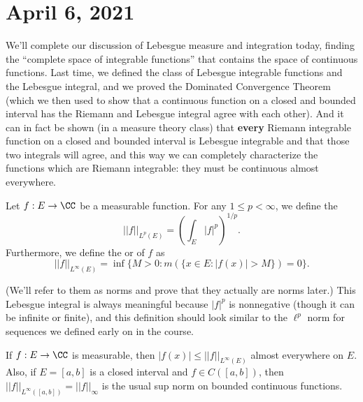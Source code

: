 
\pagebreak\section*{April 6, 2021}

We'll complete our discussion of Lebesgue measure and integration today, finding the ``complete space of integrable functions'' that contains the space of continuous functions. Last time, we defined the class of Lebesgue integrable functions and the Lebesgue integral, and we proved the Dominated Convergence Theorem (which we then used to show that a continuous function on a closed and bounded interval has the Riemann and Lebesgue integral agree with each other). And it can in fact be shown (in a measure theory class) that \textbf{every} Riemann integrable function on a closed and bounded interval is Lebesgue integrable and that those two integrals will agree, and this way we can completely characterize the functions which are Riemann integrable: they must be continuous almost everywhere. 

\begin{definition}
Let $f: E \to \CC$ be a measurable function. For any $1 \le p < \infty$, we define the 
\[
    ||f||_{L^p(E)} = \left(\int_E |f|^p\right)^{1/p}.
\]
Furthermore, we define the  or  of $f$ as
\[
    ||f||_{L^\infty(E)} = \inf\{M > 0: m(\{x \in E: |f(x)| > M \}) = 0\}.
\]
\end{definition}

(We'll refer to them as norms and prove that they actually are norms later.) This Lebesgue integral is always meaningful because $|f|^p$ is nonnegative (though it can be infinite or finite), and this definition should look similar to the $\ell^p$ norm for sequences we defined early on in the course.

\begin{proposition}
If $f: E \to \CC$ is measurable, then $|f(x)| \le ||f||_{L^{\infty}(E)}$ almost everywhere on $E$. Also, if $E = [a, b]$ is a closed interval and $f \in C([a, b])$, then $||f||_{L^\infty([a, b])} = ||f||_{\infty}$ is the usual sup norm on bounded continuous functions.
\end{proposition}

